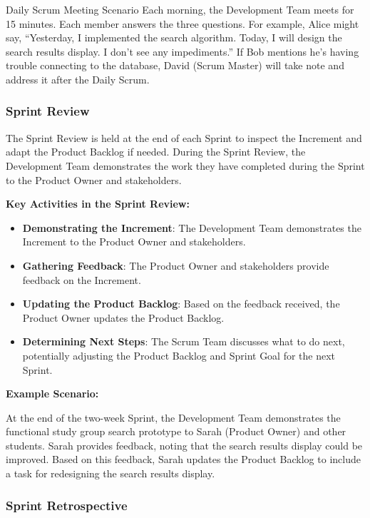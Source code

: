 \begin{examplebox}{Daily Scrum Meeting Scenario}
  Each morning, the Development Team meets for 15 minutes. Each member answers the three questions. For example, Alice might say, ``Yesterday, I implemented the search algorithm. Today, I will design the search results display. I don't see any impediments.'' If Bob mentions he's having trouble connecting to the database, David (Scrum Master) will take note and address it after the Daily Scrum.
\end{examplebox}

\subsubsection{Sprint Review}

The Sprint Review is held at the end of each Sprint to inspect the Increment
and adapt the Product Backlog if needed. During the Sprint Review, the
Development Team demonstrates the work they have completed during the Sprint to
the Product Owner and stakeholders.

\textbf{Key Activities in the Sprint Review:}

\begin{itemize}
  \item \textbf{Demonstrating the Increment}: The Development Team demonstrates the Increment to the Product Owner and stakeholders.
  \item \textbf{Gathering Feedback}: The Product Owner and stakeholders provide feedback on the Increment.
  \item \textbf{Updating the Product Backlog}: Based on the feedback received, the Product Owner updates the Product Backlog.
  \item \textbf{Determining Next Steps}: The Scrum Team discusses what to do next, potentially adjusting the Product Backlog and Sprint Goal for the next Sprint.
\end{itemize}

\textbf{Example Scenario:}

At the end of the two-week Sprint, the Development Team demonstrates the
functional study group search prototype to Sarah (Product Owner) and other
students. Sarah provides feedback, noting that the search results display could
be improved. Based on this feedback, Sarah updates the Product Backlog to
include a task for redesigning the search results display.

\subsubsection{Sprint Retrospective}

